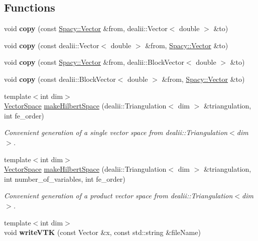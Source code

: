 \subsection*{\-Functions}
\begin{DoxyCompactItemize}
\item 
\hypertarget{namespaceSpacy_1_1dealII_a04fe7dee5a1cae496f7cea1bedf55436}{void {\bfseries copy} (const \hyperlink{classSpacy_1_1Vector}{\-Spacy\-::\-Vector} \&from, dealii\-::\-Vector$<$ double $>$ \&to)}\label{namespaceSpacy_1_1dealII_a04fe7dee5a1cae496f7cea1bedf55436}

\item 
\hypertarget{namespaceSpacy_1_1dealII_a06a29e6248e96f10f5f280a8d1ef2664}{void {\bfseries copy} (const dealii\-::\-Vector$<$ double $>$ \&from, \hyperlink{classSpacy_1_1Vector}{\-Spacy\-::\-Vector} \&to)}\label{namespaceSpacy_1_1dealII_a06a29e6248e96f10f5f280a8d1ef2664}

\item 
\hypertarget{namespaceSpacy_1_1dealII_aa0d1f70fdd6a3cf0dae15d09e9d17547}{void {\bfseries copy} (const \hyperlink{classSpacy_1_1Vector}{\-Spacy\-::\-Vector} \&from, dealii\-::\-Block\-Vector$<$ double $>$ \&to)}\label{namespaceSpacy_1_1dealII_aa0d1f70fdd6a3cf0dae15d09e9d17547}

\item 
\hypertarget{namespaceSpacy_1_1dealII_a5e94f5f0e747f1401a819e2da16b79a2}{void {\bfseries copy} (const dealii\-::\-Block\-Vector$<$ double $>$ \&from, \hyperlink{classSpacy_1_1Vector}{\-Spacy\-::\-Vector} \&to)}\label{namespaceSpacy_1_1dealII_a5e94f5f0e747f1401a819e2da16b79a2}

\item 
{\footnotesize template$<$int dim$>$ }\\\hyperlink{classSpacy_1_1VectorSpace}{\-Vector\-Space} \hyperlink{namespaceSpacy_1_1dealII_a5b48ceb52102e7accfc4b65af09380c6}{make\-Hilbert\-Space} (dealii\-::\-Triangulation$<$ dim $>$ \&triangulation, int fe\-\_\-order)
\begin{DoxyCompactList}\small\item\em \-Convenient generation of a single vector space from dealii\-::\-Triangulation$<$dim$>$. \end{DoxyCompactList}\item 
{\footnotesize template$<$int dim$>$ }\\\hyperlink{classSpacy_1_1VectorSpace}{\-Vector\-Space} \hyperlink{namespaceSpacy_1_1dealII_aa572836054091c7c907cc0c2034ac9a8}{make\-Hilbert\-Space} (dealii\-::\-Triangulation$<$ dim $>$ \&triangulation, int number\-\_\-of\-\_\-variables, int fe\-\_\-order)
\begin{DoxyCompactList}\small\item\em \-Convenient generation of a product vector space from dealii\-::\-Triangulation$<$dim$>$. \end{DoxyCompactList}\item 
\hypertarget{namespaceSpacy_1_1dealII_a34ae531adba4232c22eac3ff6dc417e2}{{\footnotesize template$<$int dim$>$ }\\void {\bfseries write\-V\-T\-K} (const \-Vector \&x, const std\-::string \&file\-Name)}\label{namespaceSpacy_1_1dealII_a34ae531adba4232c22eac3ff6dc417e2}


\end{DoxyCompactItemize}

